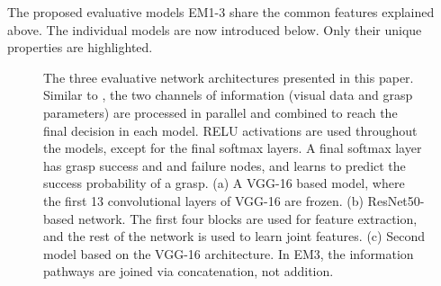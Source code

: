 The proposed evaluative models EM1-3 share the common features explained above. The individual models are now introduced below. Only their unique properties are highlighted.

\begin{figure}[t]
\centering



\caption{The three evaluative network architectures presented in this paper. Similar to \cite{Levine1}, the two channels of information (visual data and grasp parameters) are processed in parallel and combined to reach the final decision in each model. RELU activations are used throughout the models, except for the final softmax layers. A final softmax layer has grasp success and and failure nodes, and learns to predict the success probability of a grasp. (a) A VGG-16 based model, where the first 13 convolutional layers of VGG-16 are frozen. (b) ResNet50-based \cite{HeZRS15} network. The first four blocks are used for feature extraction, and the rest of the network is used to learn joint features. (c) Second model based on the VGG-16 architecture. In EM3, the information pathways are joined via concatenation, not addition.
\label{fig:networkArchitecture2}}
\end{figure}

